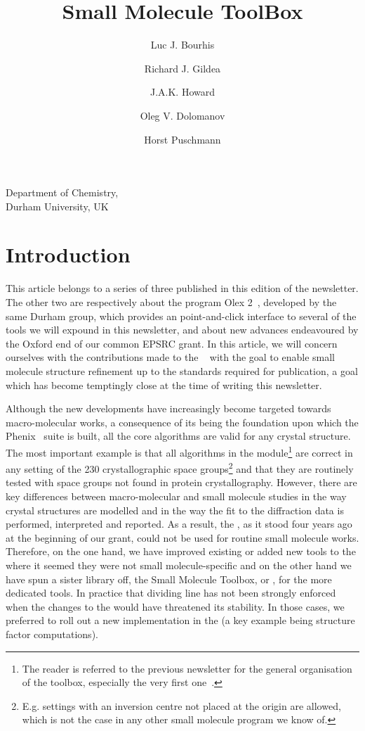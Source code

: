 \documentclass[12pt]{article}
\title{Small Molecule ToolBox}
\author{Luc J. Bourhis \and Richard J. Gildea \and J.A.K. Howard \and Oleg V. Dolomanov \and Horst Puschmann}
\date{}
\begin{document}
\maketitle
\begin{center}
Department of Chemistry, \\
Durham University, UK
\end{center}

\section{Introduction}

This article belongs to a series of three published in this edition of the newsletter. The other two are respectively about the program Olex 2~\cite{Dolomanov:2009}, developed by the same Durham group, which provides an point-and-click interface to several of the tools we will expound in this newsletter, and about new advances endeavoured by the Oxford end of our common EPSRC grant. In this article, we will concern ourselves with the contributions made to the \cctbx~\cite{cctbx} with the goal to enable small molecule structure refinement up to the standards required for publication, a goal which has become temptingly close at the time of writing this newsletter.

Although the \cctbx new developments have increasingly become targeted towards macro-molecular works, a consequence of its being the foundation upon which the Phenix~\cite{phenix} suite is built, all the core algorithms are valid for any crystal structure. The most important example is that all algorithms in the \cctbx module\footnote{The reader is referred to the previous \cctbx newsletter for the general organisation of the toolbox, especially the very first one~\cite{Grosse-Kunstleve:2003}.} are correct in any setting of the 230 crystallographic space groups\footnote{E.g. settings with an inversion centre not placed at the origin are allowed, which is not the case in any other small molecule program we know of.} and that they are routinely tested with space groups not found in protein crystallography. However, there are key differences between macro-molecular and small molecule studies in the way crystal structures are modelled and in the way the fit to the diffraction data is performed, interpreted and reported. As a result, the \cctbx, as it stood four years ago at the beginning of our grant, could not be used for routine small molecule works. Therefore, on the one hand, we have improved existing or added new tools to the \cctbx where it seemed they were not small molecule-specific and on the other hand we have spun a sister library off, the Small Molecule Toolbox, or \smtbx, for the more dedicated tools. In practice that dividing line has not been strongly enforced when the changes to the \cctbx would have threatened its stability. In those cases, we preferred to roll out a new implementation in the \smtbx (a key example being structure factor computations).
\end{document}
